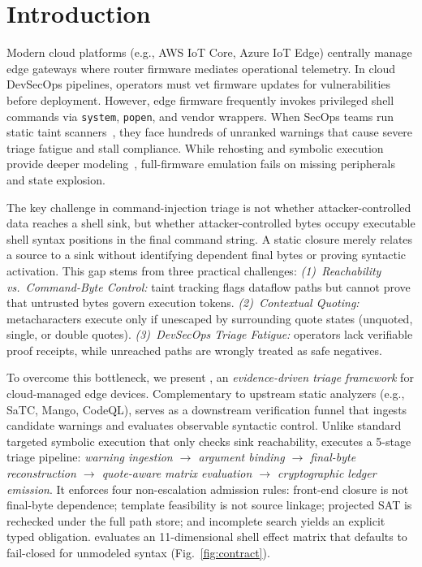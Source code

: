\section{Introduction}
\label{sec:introduction}

Modern cloud platforms (e.g., AWS IoT Core, Azure IoT Edge) centrally manage edge gateways where router firmware mediates operational telemetry. In cloud DevSecOps pipelines, operators must vet firmware updates for vulnerabilities before deployment. However, edge firmware frequently invokes privileged shell commands via \texttt{system}, \texttt{popen}, and vendor wrappers. When SecOps teams run static taint scanners~\cite{firmalice2015,karonte2020,satc2021,hermescan2024,mango2024,ye2024cmd}, they face hundreds of unranked warnings that cause severe triage fatigue and stall compliance. While rehosting and symbolic execution provide deeper modeling~\cite{firmadyne2016,firmae2020,wright2021rehosting,angr2016,surveyse2018}, full-firmware emulation fails on missing peripherals and state explosion.

The key challenge in command-injection triage is not whether attacker-controlled data reaches a shell sink, but whether attacker-controlled bytes occupy executable shell syntax positions in the final command string. A static closure merely relates a source to a sink without identifying dependent final bytes or proving syntactic activation. This gap stems from three practical challenges:
\emph{(1)~Reachability vs.\ Command-Byte Control:} taint tracking flags dataflow paths but cannot prove that untrusted bytes govern execution tokens.
\emph{(2)~Contextual Quoting:} metacharacters execute only if unescaped by surrounding quote states (unquoted, single, or double quotes).
\emph{(3)~DevSecOps Triage Fatigue:} operators lack verifiable proof receipts, while unreached paths are wrongly treated as safe negatives.

To overcome this bottleneck, we present \tool, an \emph{evidence-driven triage framework} for cloud-managed edge devices. Complementary to upstream static analyzers (e.g., SaTC, Mango, CodeQL), \tool serves as a downstream verification funnel that ingests candidate warnings and evaluates observable syntactic control. Unlike standard targeted symbolic execution that only checks sink reachability, \tool executes a 5-stage triage pipeline: \emph{warning ingestion $\to$ argument binding $\to$ final-byte reconstruction $\to$ quote-aware matrix evaluation $\to$ cryptographic ledger emission}. It enforces four non-escalation admission rules: front-end closure is not final-byte dependence; template feasibility is not source linkage; projected SAT is rechecked under the full path store; and incomplete search yields an explicit typed obligation. \tool evaluates an 11-dimensional shell effect matrix that defaults to fail-closed for unmodeled syntax (Fig.~\ref{fig:contract}).

